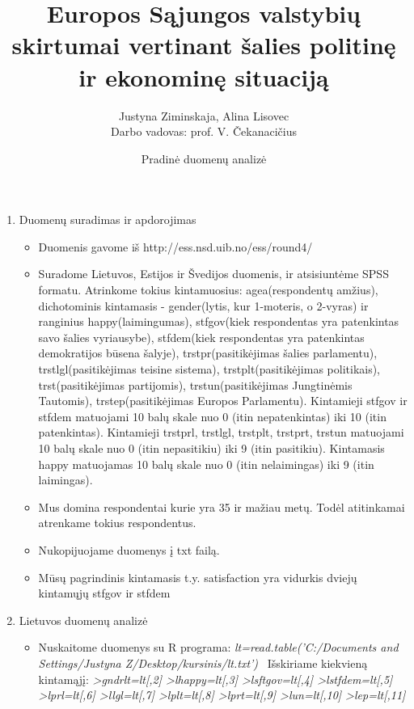 \documentclass[a4paper]{article}
\title{Europos Sąjungos valstybių skirtumai vertinant šalies politinę ir ekonominę situaciją}
\date{Pradinė duomenų analizė}
\author{Justyna Ziminskaja, Alina Lisovec \\ Darbo vadovas: prof. V. Čekanacičius}
\begin{document}
\maketitle


\begin{enumerate}

\item  Duomenų suradimas ir apdorojimas

\begin{itemize}
\item Duomenis gavome iš http://ess.nsd.uib.no/ess/round4/
\item Suradome Lietuvos, Estijos ir Švedijos duomenis, ir atsisiuntėme SPSS formatu. Atrinkome tokius kintamuosius: agea(respondentų amžius), dichotominis kintamasis - gender(lytis, kur 1-moteris, o 2-vyras) ir ranginius happy(laimingumas), stfgov(kiek respondentas yra patenkintas savo šalies vyriausybe), stfdem(kiek respondentas yra patenkintas demokratijos būsena šalyje), trstpr(pasitikėjimas šalies parlamentu), trstlgl(pasitikėjimas teisine sistema), trstplt(pasitikėjimas politikais), trst(pasitikėjimas partijomis), trstun(pasitikėjimas Jungtinėmis Tautomis), trstep(pasitikėjimas Europos Parlamentu).
\newline Kintamieji stfgov ir stfdem matuojami 10 balų skale nuo 0 (itin nepatenkintas) iki 10 (itin patenkintas). Kintamieji trstprl, trstlgl, trstplt, trstprt, trstun matuojami 10 balų skale nuo 0 (itin nepasitikiu) iki 9 (itin pasitikiu). Kintamasis happy matuojamas 10 balų skale nuo 0 (itin nelaimingas) iki 9 (itin laimingas).

\item Mus domina respondentai kurie yra 35 ir mažiau metų. Todėl atitinkamai atrenkame tokius respondentus.
\item Nukopijuojame duomenys į txt failą.

\item Mūsų pagrindinis kintamasis t.y. satisfaction yra vidurkis dviejų kintamųjų stfgov ir stfdem

\end{itemize}

\item Lietuvos duomenų analizė

\begin{itemize}
\item Nuskaitome duomenys su R programa: 
\newline
\textit {lt=read.table('C:/Documents and Settings/Justyna Z/Desktop/kursinis/lt.txt')}
\ Išskiriame kiekvieną kintamąjį:
\newline
\textit {>gndrlt=lt[,2] 
\newline >lhappy=lt[,3] 
\newline >lsftgov=lt[,4]
\newline >lstfdem=lt[,5]
\newline >lprl=lt[,6]
\newline >llgl=lt[,7]
\newline >lplt=lt[,8]
\newline >lprt=lt[,9]
\newline >lun=lt[,10]
\newline >lep=lt[,11]}


\end{itemize}
\end{enumerate}
\end{document}
